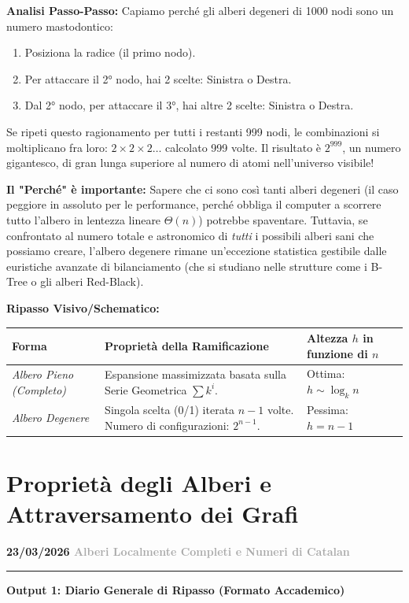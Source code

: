 \documentclass[a4paper, 11pt]{report}
\newcommand{\lezione}[2]{
\vspace{2em}
\noindent\textbf{\Large #1 \hfill \textcolor{darkgray}{#2}}
\vspace{0.5em}
\hrule
\vspace{1.5em}
}
\begin{document}
\textbf{Analisi Passo-Passo:}
Capiamo perché gli alberi degeneri di 1000 nodi sono un numero mastodontico:
\begin{enumerate}
    \item Posiziona la radice (il primo nodo).
    \item Per attaccare il 2° nodo, hai 2 scelte: Sinistra o Destra.
    \item Dal 2° nodo, per attaccare il 3°, hai altre 2 scelte: Sinistra o Destra.
\end{enumerate}
Se ripeti questo ragionamento per tutti i restanti 999 nodi, le combinazioni si moltiplicano fra loro: $2 \times 2 \times 2 \dots$ calcolato 999 volte. Il risultato è $2^{999}$, un numero gigantesco, di gran lunga superiore al numero di atomi nell'universo visibile!

\textbf{Il "Perché" è importante:}
Sapere che ci sono così tanti alberi degeneri (il caso peggiore in assoluto per le performance, perché obbliga il computer a scorrere tutto l'albero in lentezza lineare $\Theta(n)$) potrebbe spaventare. Tuttavia, se confrontato al numero totale e astronomico di \textit{tutti} i possibili alberi sani che possiamo creare, l'albero degenere rimane un'eccezione statistica gestibile dalle euristiche avanzate di bilanciamento (che si studiano nelle strutture come i B-Tree o gli alberi Red-Black).

\textbf{Ripasso Visivo/Schematico:}
\begin{center}
\begin{tabular}{|p{3cm}|p{6cm}|p{4.5cm}|}
\hline
\textbf{Forma} & \textbf{Proprietà della Ramificazione} & \textbf{Altezza $h$ in funzione di $n$} \\
\hline
\textit{Albero Pieno (Completo)} & Espansione massimizzata basata sulla Serie Geometrica $\sum k^i$. & Ottima: $h \sim \log_k n$ \\
\hline
\textit{Albero Degenere} & Singola scelta (0/1) iterata $n-1$ volte. Numero di configurazioni: $2^{n-1}$. & Pessima: $h = n - 1$ \\
\hline
\end{tabular}
\end{center}
\chapter{Proprietà degli Alberi e Attraversamento dei Grafi}

\lezione{23/03/2026}{Alberi Localmente Completi e Numeri di Catalan}

\vspace{0.5cm}
\textbf{Output 1: Diario Generale di Ripasso (Formato Accademico)}
\end{document}

